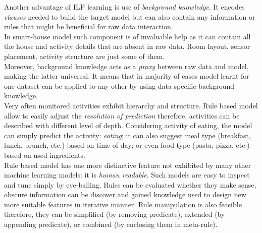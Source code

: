 \documentclass[12pt, a4paper, pdflatex, leqno, twoside, openright]{report}
\begin{document}
Another advantage of ILP learning is use of \emph{background knowledge}. It encodes \emph{clauses} needed to build the target model but can also contain any information or rules that might be beneficial for raw data interaction.\\
In smart-house model such component is of invaluable help as it can contain all the house and activity details that are absent in raw data. Room layout, sensor placement, activity structure are just some of them.\\
Moreover, background knowledge acts as a \emph{proxy} between raw data and model, making the latter universal. It means that in majority of cases model learnt for one dataset can be applied to any other by using data-specific background knowledge.\\

Very often monitored activities exhibit hierarchy and structure. Rule based model allow to easily adjust the \emph{resolution of prediction} therefore, activities can be described with different level of depth. Considering activity of eating, the model can simply predict the activity: \emph{eating}; it can also suggest meal type (breakfast, lunch, brunch, etc.) based on time of day; or even food type (pasta, pizza, etc.) based on used ingredients.\\

Rule based model has one more distinctive feature not exhibited by many other machine learning models: it is \emph{human readable}. Such models are easy to inspect and tune simply by eye-balling. Rules can be evaluated whether they make sense, obscure information can be discover and gained knowledge used to design new more suitable features in iterative manner. Rule manipulation is also feasible therefore, they can be simplified (by removing predicate), extended (by appending predicate), or combined (by enclosing them in meta-rule).\\
\end{document}
